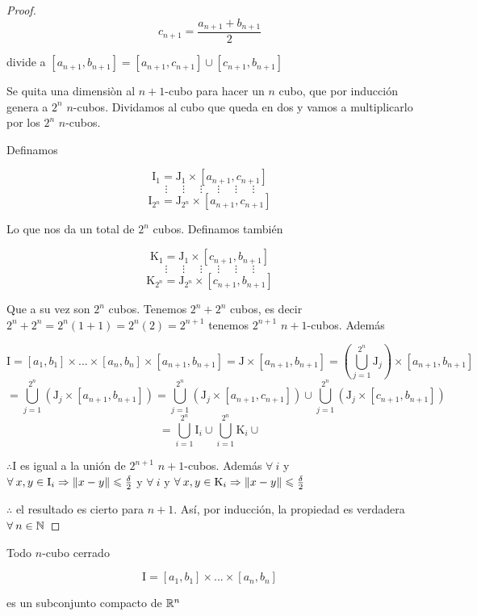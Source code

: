 \begin{proof}
     $$c_{n+1} = \frac{a_{n+1}+b_{n+1}}{2} $$

     divide a $[a_{n+1},b_{n+1}] = [a_{n+1},c_{n+1}] \cup [c_{n+1},b_{n+1}]$

     Se quita una dimensiòn al $n+1$-cubo para hacer un $n$ cubo, que por inducción genera a $2^n$ $n$-cubos. Dividamos al cubo que queda en dos y vamos a multiplicarlo por los $2^n$ $n$-cubos.

     Definamos 

     $$\mathrm{I}_1 = \mathrm{J}_1 \times [a_{n+1},c_{n+1}]$$
     $$\vdots \: \: \: \: \: \:\vdots \: \: \: \: \: \:\vdots \: \: \: \: \: \:\vdots \: \: \: \: \: \:\vdots \: \: \: \: \: \:\vdots$$
     $$\mathrm{I}_{2^n} = \mathrm{J}_{2^n} \times [a_{n+1},c_{n+1}]$$

     Lo que nos da un total de $2^n$ cubos. Definamos también

     $$\mathrm{K}_1 = \mathrm{J}_1 \times [c_{n+1},b_{n+1}]$$
     $$\vdots \: \: \: \: \: \:\vdots \: \: \: \: \: \:\vdots \: \: \: \: \: \:\vdots \: \: \: \: \: \:\vdots \: \: \: \: \: \:\vdots$$
     $$\mathrm{K}_{2^n} = \mathrm{J}_{2^n} \times [c_{n+1},b_{n+1}]$$

     Que a su vez son $2^n$ cubos. Tenemos $2^n + 2^n$ cubos, es decir $2^n + 2^n = 2^n (1+1) = 2^n (2) = 2^{n+1}$ tenemos $2^{n+1}$ $n+1$-cubos. Además

     $$\mathrm{I} = [a_1,b_1] \times ... \times [a_n,b_n] \times [a_{n+1},b_{n+1}] = \mathrm{J} \times [a_{n+1},b_{n+1}] = \left( \bigcup_{j=1}^{2^n}  \mathrm{J}_{j} \right) \times [a_{n+1},b_{n+1}]$$
     $$= \bigcup_{j=1}^{2^n} \left(  \mathrm{J}_{j} \times [a_{n+1},b_{n+1}] \right) = \bigcup_{j=1}^{2^n} \left(  \mathrm{J}_{j} \times [a_{n+1},c_{n+1}] \right) \cup \bigcup_{j=1}^{2^n} \left(  \mathrm{J}_{j} \times [c_{n+1},b_{n+1}] \right)$$
     $$= \bigcup_{i=1}^{2^n} \mathrm{I}_i \cup \bigcup_{i=1}^{2^n} \mathrm{K}_i \cup $$

     $\therefore \mathrm{I}$ es igual a la unión de $2^{n+1}$ $n+1$-cubos. Además $\forall \: i$ y $\forall \: x,y \in \mathrm{I}_i \Rightarrow \norm{x-y} \leqslant \frac{\delta}{2}$ y $\forall \: i$ y $\forall \: x,y \in \mathrm{K}_i \Rightarrow \norm{x-y} \leqslant \frac{\delta}{2}$

     $\therefore$ el resultado es cierto para $n+1$. Así, por inducción, la propiedad es verdadera $\forall \: n \in \mathbb{N}$
\end{proof}

\begin{lemma}
    Todo $n$-cubo cerrado 

    $$\mathrm{I} = [a_1,b_1] \times ... \times [a_{n},b_{n}] $$

    es un subconjunto compacto de $\mathbb{R}^n$
\end{lemma}

